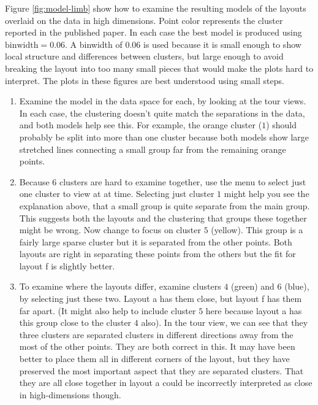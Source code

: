 Figure \ref{fig:model-limb} show how to examine the resulting models of the layouts overlaid on the data in high dimensions. Point color represents the cluster reported in the published paper. In each case the best model is produced using \(\text{binwidth}=0.06\). A binwidth of \(0.06\) is used because it is small enough to show local structure and differences between clusters, but large enough to avoid breaking the layout into too many small pieces that would make the plots hard to interpret. The plots in these figures are best understood using small steps.

\begin{enumerate}
\def\labelenumi{\arabic{enumi}.}
\item
  Examine the model in the data space for each, by looking at the tour views. In each case, the clustering doesn't quite match the separations in the data, and both models help see this. For example, the orange cluster (\(1\)) should probably be split into more than one cluster because both models show large stretched lines connecting a small group far from the remaining orange points.
\item
  Because \(6\) clusters are hard to examine together, use the menu to select just one cluster to view at at time. Selecting just cluster \(1\) might help you see the explanation above, that a small group is quite separate from the main group. This suggests both the layouts and the clustering that groups these together might be wrong. Now change to focus on cluster \(5\) (yellow). This group is a fairly large sparse cluster but it is separated from the other points. Both layouts are right in separating these points from the others but the fit for layout f is slightly better.
\item
  To examine where the layouts differ, examine clusters \(4\) (green) and \(6\) (blue), by selecting just these two. Layout a has them close, but layout f has them far apart. (It might also help to include cluster \(5\) here because layout a has this group close to the cluster \(4\) also). In the tour view, we can see that they three clusters are separated clusters in different directions away from the most of the other points. They are both correct in this. It may have been better to place them all in different corners of the layout, but they have preserved the most important aspect that they are separated clusters. That they are all close together in layout a could be incorrectly interpreted as close in high-dimensions though.
\end{enumerate}

